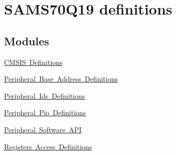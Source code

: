 \hypertarget{group__SAMS70Q19__definitions}{}\section{S\+A\+M\+S70\+Q19 definitions}
\label{group__SAMS70Q19__definitions}
\subsection*{Modules}
\begin{DoxyCompactItemize}
\item 
\mbox{\hyperlink{group__SAMS70Q19__cmsis}{C\+M\+S\+I\+S Definitions}}
\item 
\mbox{\hyperlink{group__SAMS70Q19__base}{Peripheral Base Address Definitions}}
\item 
\mbox{\hyperlink{group__SAMS70Q19__id}{Peripheral Ids Definitions}}
\item 
\mbox{\hyperlink{group__SAMS70Q19__pio}{Peripheral Pio Definitions}}
\item 
\mbox{\hyperlink{group__SAMS70Q19__api}{Peripheral Software A\+PI}}
\item 
\mbox{\hyperlink{group__SAMS70Q19__reg}{Registers Access Definitions}}
\end{DoxyCompactItemize}
